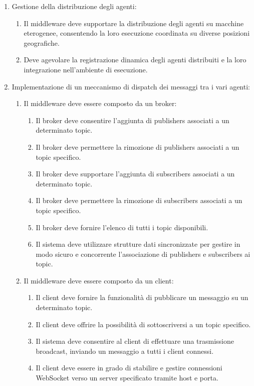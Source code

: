 \begin{enumerate}
    \item Gestione della distribuzione degli agenti:
          \begin{enumerate}
              \item  Il middleware deve supportare la distribuzione degli agenti su macchine eterogenee,
                    consentendo la loro esecuzione coordinata su diverse posizioni geografiche.
              \item Deve agevolare la registrazione dinamica degli agenti distribuiti e la
                    loro integrazione nell'ambiente di esecuzione.
          \end{enumerate}

    \item Implementazione di un meccanismo di dispatch dei messaggi tra i vari agenti:
          \begin{enumerate}
              \item Il middleware deve essere composto da un broker:
                    \begin{enumerate}
                        \item Il broker deve consentire l'aggiunta di publishers associati a un determinato topic.
                        \item Il broker deve permettere la rimozione di publishers associati a un topic specifico.
                        \item Il broker deve supportare l'aggiunta di subscribers associati a un determinato topic.
                        \item Il broker deve permettere la rimozione di subscribers associati a un topic specifico.
                        \item Il broker deve fornire l'elenco di tutti i topic disponibili.
                        \item Il sistema deve utilizzare strutture dati sincronizzate per gestire in modo sicuro e concorrente l'associazione di publishers e subscribers ai topic.
                    \end{enumerate}
              \item Il middleware deve essere composto da un client:
                    \begin{enumerate}
                        \item Il client deve fornire la funzionalità di pubblicare un messaggio su un determinato topic.
                        \item Il client deve offrire la possibilità di sottoscriversi a un topic specifico.
                        \item Il sistema deve consentire al client di effettuare una trasmissione broadcast, inviando un messaggio a tutti i client connessi.
                        \item  Il client deve essere in grado di stabilire e gestire connessioni WebSocket verso un server specificato tramite host e porta.
                    \end{enumerate}
          \end{enumerate}


\end{enumerate}
